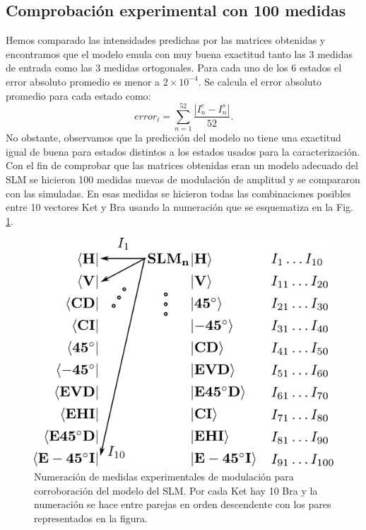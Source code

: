 \subsection{Comprobación experimental con 100 medidas}
\label{sec:exp_validation}
Hemos comparado las intensidades predichas por las matrices obtenidas
y encontramos que el modelo emula con muy buena exactitud tanto las 3 medidas
de entrada como las 3 medidas ortogonales. Para cada uno de los 6
estados el error absoluto promedio es menor a $2\times10^{-4}$.  Se
calcula el error absoluto promedio para cada estado como: 
\begin{equation*}
error_i = \sum_{n=1}^{52}\frac{|I_n^e-I_n^s|}{52}.
\end{equation*}   
No obstante, observamos que la predicción del modelo no tiene una
exactitud igual de buena para estados distintos a los estados usados
para la caracterización. 
Con el fin de comprobar que las matrices obtenidas eran un modelo adecuado
del SLM se hicieron 100 medidas nuevas de modulación de amplitud y se
compararon con las simuladas. En esas medidas se hicieron todas las combinaciones
posibles entre 10 vectores Ket y Bra usando la 
numeración que se esquematiza en la Fig. \ref{fig:braket_100_notation}.
\begin{figure}[h!]
\centering
\includegraphics[scale=.4]{brakets.pdf}
\caption[Numeración de medidas experimentales de modulación para
corroboración del modelo de SLM]{Numeración de medidas experimentales de modulación para
corroboración del modelo del SLM. Por cada Ket hay 10 Bra y la
numeración se hace entre parejas en orden descendente con los pares
representados en la figura. }
\label{fig:braket_100_notation}
\end{figure}
